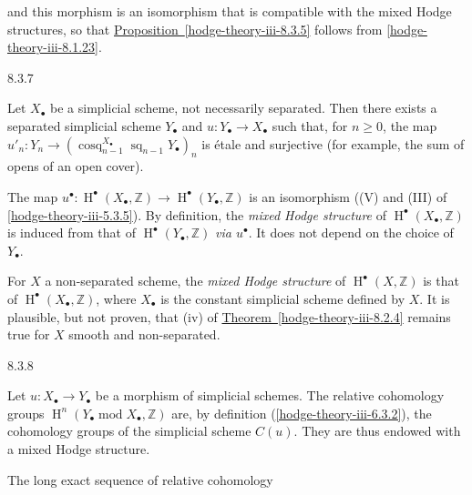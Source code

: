 
  and this morphism is an isomorphism that is compatible with the mixed Hodge structures, so that \hyperref[hodge-theory-iii-8.3.5]{Proposition~\ref*{hodge-theory-iii-8.3.5}} follows from \cref{hodge-theory-iii-8.1.23}.\begin{example}{8.3.7}\label{hodge-theory-iii-8.3.7}\skipsinglepar\par{}Let \(X_\bullet \) be a simplicial scheme, not necessarily separated.
    Then there exists a separated simplicial scheme \(Y_\bullet \) and \(u\colon  Y_\bullet \to  X_\bullet \) such that, for \(n\geq 0\), the map \(u'_n\colon  Y_n\to (\operatorname {cosq}_{n-1}^{X_\bullet }\operatorname {sq}_{n-1}Y_\bullet )_n\) is étale and surjective (for example, the sum of opens of an open cover).\par{}The map \(u^\bullet \colon \operatorname {H}^\bullet (X_\bullet ,\mathbb {Z})\to \operatorname {H}^\bullet (Y_\bullet ,\mathbb {Z})\) is an isomorphism ((V) and (III) of \cref{hodge-theory-iii-5.3.5}).
    By definition, the \emph{mixed Hodge structure} of \(\operatorname {H}^\bullet (X_\bullet ,\mathbb {Z})\) is induced from that of \(\operatorname {H}^\bullet (Y_\bullet ,\mathbb {Z})\) \emph{via \(u^\bullet \)}.
    It does not depend on the choice of \(Y_\bullet \).\par{}For \(X\) a non-separated scheme, the \emph{mixed Hodge structure} of \(\operatorname {H}^\bullet (X,\mathbb {Z})\) is that of \(\operatorname {H}^\bullet (X_\bullet ,\mathbb {Z})\), where \(X_\bullet \) is the constant simplicial scheme defined by \(X\).
    It is plausible, but not proven, that (iv) of \hyperref[hodge-theory-iii-8.2.4]{Theorem~\ref*{hodge-theory-iii-8.2.4}} remains true for \(X\) smooth and non-separated.\end{example}\begin{example}{8.3.8}\label{hodge-theory-iii-8.3.8}\skipsinglepar\par{}Let \(u\colon  X_\bullet \to  Y_\bullet \) be a morphism of simplicial schemes.
    The relative cohomology groups \(\operatorname {H}^n(Y_\bullet \operatorname {mod} X_\bullet ,\mathbb {Z})\) are, by definition (\cref{hodge-theory-iii-6.3.2}), the cohomology groups of the simplicial scheme \(C(u)\).
    They are thus endowed with a mixed Hodge structure.\end{example}\label{hodge-theory-iii-8.3.9}\par{}The long exact sequence of relative cohomology
